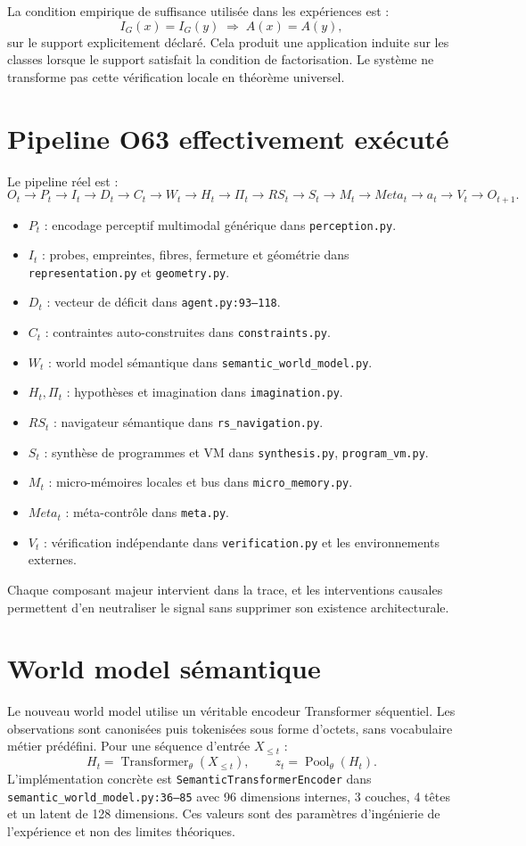 \documentclass[11pt,a4paper]{article}
\newcommand{\code}[1]{\texttt{#1}}
\begin{document}
La condition empirique de suffisance utilisée dans les expériences est :
\[
I_G(x)=I_G(y)\;\Rightarrow\;A(x)=A(y),
\]
sur le support explicitement déclaré. Cela produit une application induite sur les classes lorsque le support satisfait la condition de factorisation. Le système ne transforme pas cette vérification locale en théorème universel.

\section{Pipeline O63 effectivement exécuté}
Le pipeline réel est :
\[
O_t\to P_t\to I_t\to D_t\to C_t\to W_t\to H_t\to \Pi_t
\to RS_t\to S_t\to M_t\to Meta_t\to a_t\to V_t\to O_{t+1}.
\]
\begin{itemize}
\item $P_t$ : encodage perceptif multimodal générique dans \code{perception.py}.
\item $I_t$ : probes, empreintes, fibres, fermeture et géométrie dans \code{representation.py} et \code{geometry.py}.
\item $D_t$ : vecteur de déficit dans \code{agent.py:93--118}.
\item $C_t$ : contraintes auto-construites dans \code{constraints.py}.
\item $W_t$ : world model sémantique dans \code{semantic\_world\_model.py}.
\item $H_t,\Pi_t$ : hypothèses et imagination dans \code{imagination.py}.
\item $RS_t$ : navigateur sémantique dans \code{rs\_navigation.py}.
\item $S_t$ : synthèse de programmes et VM dans \code{synthesis.py}, \code{program\_vm.py}.
\item $M_t$ : micro-mémoires locales et bus dans \code{micro\_memory.py}.
\item $Meta_t$ : méta-contrôle dans \code{meta.py}.
\item $V_t$ : vérification indépendante dans \code{verification.py} et les environnements externes.
\end{itemize}
Chaque composant majeur intervient dans la trace, et les interventions causales permettent d’en neutraliser le signal sans supprimer son existence architecturale.

\section{World model sémantique}
Le nouveau world model utilise un véritable encodeur Transformer séquentiel. Les observations sont canonisées puis tokenisées sous forme d’octets, sans vocabulaire métier prédéfini. Pour une séquence d’entrée $X_{\le t}$ :
\[
H_t=\operatorname{Transformer}_\theta(X_{\le t}),
\qquad z_t=\operatorname{Pool}_\theta(H_t).
\]
L’implémentation concrète est \code{SemanticTransformerEncoder} dans \code{semantic\_world\_model.py:36--85} avec 96 dimensions internes, 3 couches, 4 têtes et un latent de 128 dimensions. Ces valeurs sont des paramètres d’ingénierie de l’expérience et non des limites théoriques.
\end{document}
